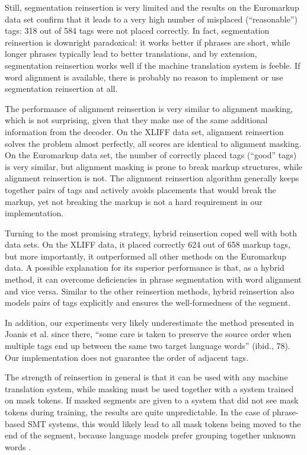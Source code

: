 \documentclass[11pt,letterpaper]{article}
\begin{document}
Still, segmentation reinsertion is very limited and the results on the Euromarkup data set confirm that it leads to a very high number of misplaced (``reasonable'') tags: 318 out of 584 tags were not placed correctly. In fact, segmentation reinsertion is downright paradoxical: it works better if phrases are short, while longer phrases typically lead to better translations, and by extension, segmentation reinsertion works well if the machine translation system is feeble. If word alignment is available, there is probably no reason to implement or use segmentation reinsertion at all.

The performance of alignment reinsertion is very similar to alignment masking, which is not surprising, given that they make use of the same additional information from the decoder. On the XLIFF data set, alignment reinsertion solves the problem almost perfectly, all scores are identical to alignment masking. On the Euromarkup data set, the number of correctly placed tags (``good'' tags) is very similar, but alignment masking is prone to break markup structures, while alignment reinsertion is not. The alignment reinsertion algorithm generally keeps together pairs of tags and actively avoids placements that would break the markup, yet not breaking the markup is not a hard requirement in our implementation.

Turning to the most promising strategy, hybrid reinsertion coped well with both data sets. On the XLIFF data, it placed correctly 624 out of 658 markup tags, but more importantly, it outperformed all other methods on the Euromarkup data. A possible explanation for its superior performance is that, as a hybrid method, it can overcome deficiencies in phrase segmentation with word alignment and vice versa. Similar to the other reinsertion methods, hybrid reinsertion also models pairs of tags explicitly and ensures the well-formedness of the segment.

In addition, our experiments very likely underestimate the method presented in Joanis et al.  since there, ``some care is taken to preserve the source order when multiple tags end up between the same two target language words'' (ibid., 78). Our implementation does not guarantee the order of adjacent tags. 

The strength of reinsertion in general is that it can be used with any machine translation system, while masking must be used together with a system trained on mask tokens. If masked segments are given to a system that did not see mask tokens during training, the results are quite unpredictable. In the case of phrase-based SMT systems, this would likely lead to all mask tokens being moved to the end of the segment, because language models prefer grouping together unknown words \cite{fishel2014handling}.
\end{document}
